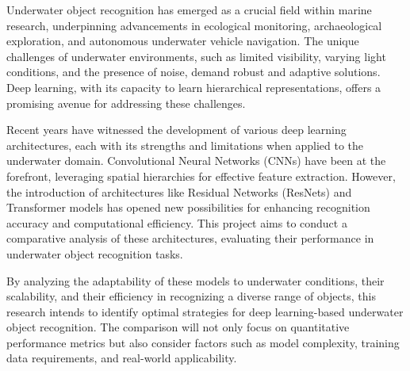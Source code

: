 Underwater object recognition has emerged as a crucial field within marine
research, underpinning advancements in ecological monitoring, archaeological
exploration, and autonomous underwater vehicle navigation.
The unique challenges of underwater environments, such as limited visibility,
varying light conditions, and the presence of noise, demand robust and adaptive
solutions.
Deep learning, with its capacity to learn hierarchical representations,
offers a promising avenue for addressing these challenges.

Recent years have witnessed the development of various deep learning
architectures, each with its strengths and limitations when applied to the
underwater domain.
Convolutional Neural Networks (CNNs) have been at the forefront,
leveraging spatial hierarchies for effective feature extraction.
However, the introduction of architectures like Residual Networks (ResNets)
and Transformer models has opened new possibilities for enhancing recognition
accuracy and computational efficiency.
This project aims to conduct a comparative analysis of these architectures,
evaluating their performance in underwater object recognition tasks.

By analyzing the adaptability of these models to underwater conditions,
their scalability, and their efficiency in recognizing a diverse range of
objects, this research intends to identify optimal strategies
for deep learning-based underwater object recognition.
The comparison will not only focus on quantitative performance metrics but also
consider factors such as model complexity,
training data requirements, and real-world applicability.